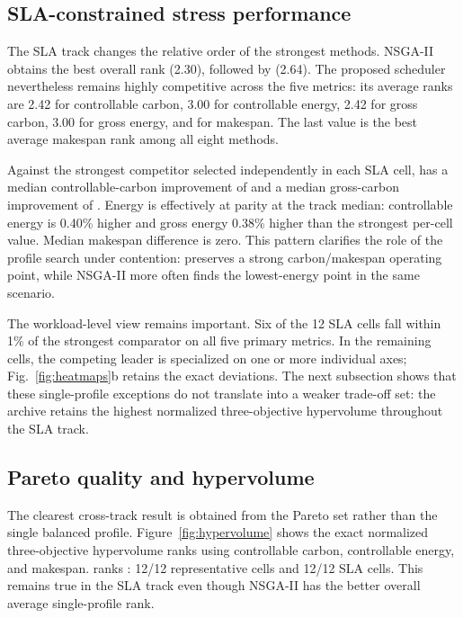 \subsection{SLA-constrained stress performance}

The SLA track changes the relative order of the strongest methods. NSGA-II obtains the best overall rank (2.30), followed by \method (2.64). The proposed scheduler nevertheless remains highly competitive across the five metrics: its average ranks are 2.42 for controllable carbon, 3.00 for controllable energy, 2.42 for gross carbon, 3.00 for gross energy, and  for makespan. The last value is the best average makespan rank among all eight methods.

Against the strongest competitor selected independently in each SLA cell, \method has a median controllable-carbon improvement of  and a median gross-carbon improvement of . Energy is effectively at parity at the track median: controllable energy is 0.40\% higher and gross energy 0.38\% higher than the strongest per-cell value. Median makespan difference is zero. This pattern clarifies the role of the profile search under contention: \method preserves a strong carbon/makespan operating point, while NSGA-II more often finds the lowest-energy point in the same scenario.

The workload-level view remains important. Six of the 12 SLA cells fall within 1\% of the strongest comparator on all five primary metrics. In the remaining cells, the competing leader is specialized on one or more individual axes; Fig.~\ref{fig:heatmaps}b retains the exact deviations. The next subsection shows that these single-profile exceptions do not translate into a weaker trade-off set: the \method archive retains the highest normalized three-objective hypervolume throughout the SLA track.

\subsection{Pareto quality and hypervolume}
\label{sec:pareto-results}

The clearest cross-track result is obtained from the Pareto set rather than the single balanced profile. Figure~\ref{fig:hypervolume} shows the exact normalized three-objective hypervolume ranks using controllable carbon, controllable energy, and makespan. \method ranks : 12/12 representative cells and 12/12 SLA cells. This remains true in the SLA track even though NSGA-II has the better overall average single-profile rank.

